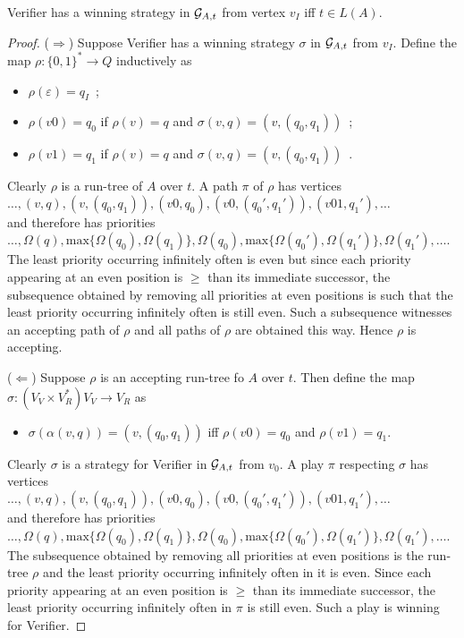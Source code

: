 \documentclass[runningheads,a4paper]{llncs}
\begin{document}
\begin{lemma}\label{lem:acceptance-game}
Verifier has a winning strategy in $\mathcal{G}_{A,t}$ from vertex $v_I$ iff $t \in L(A)$.
\end{lemma}

\begin{proof}
\noindent ($\Rightarrow$) Suppose Verifier has a winning strategy $\sigma$ in $\mathcal{G}_{A,t}$ from $v_I$. Define the map $\rho: \{0,1\}^* \to Q$ inductively as 
\begin{itemize}
\item $\rho(\varepsilon) = q_I$\ ;
\item $\rho(v0) = q_0$ if $\rho(v) = q$ and $\sigma(v,q) = (v,(q_0,q_1))$\ ;
\item $\rho(v1) = q_1$ if $\rho(v) = q$ and $\sigma(v,q) = (v,(q_0,q_1))$\ .
\end{itemize}
Clearly $\rho$ is a run-tree of $A$ over $t$. A path $\pi$ of $\rho$ has vertices \\
 $\ldots,(v,q), (v,(q_0,q_1)), (v0, q_0), (v0,(q_0',q_1')), (v01, q_1'),\ldots$ \\ and therefore has priorities\\
 $\ldots,\Omega(q), \mathrm{max}\{\Omega(q_0), \Omega(q_1)\}, \Omega(q_0), \mathrm{max}\{\Omega(q_0'), \Omega(q_1')\}, \Omega(q_1'),\ldots$.\\
The least priority occurring infinitely often is even but since each priority appearing at an even position is $\geq$ than its immediate successor, the subsequence obtained by removing all priorities at even positions is such that the least priority occurring infinitely often is still even. Such a subsequence witnesses an accepting path of $\rho$ and all paths of $\rho$ are obtained this way. Hence $\rho$ is accepting.

\noindent ($\Leftarrow$) Suppose $\rho$ is an accepting run-tree fo $A$ over $t$. Then define the map 
 $\sigma: (V_V \times V_R^*)V_V \to V_R$ as 
\begin{itemize}
\item $\sigma(\alpha (v,q)) = (v,(q_0,q_1))$ iff $\rho(v0) = q_0$ and $\rho(v1) = q_1$.
\end{itemize}
Clearly $\sigma$ is a strategy for Verifier in $\mathcal{G}_{A,t}$ from $v_0$. A play $\pi$ respecting $\sigma$ has vertices \\
 $\ldots,(v,q), (v,(q_0,q_1)), (v0, q_0), (v0,(q_0',q_1')), (v01, q_1'),\ldots$ \\ and therefore has priorities\\
 $\ldots,\Omega(q), \mathrm{max}\{\Omega(q_0), \Omega(q_1)\}, \Omega(q_0), \mathrm{max}\{\Omega(q_0'), \Omega(q_1')\}, \Omega(q_1'),\ldots$.\\
The subsequence obtained by removing all priorities at even positions is the run-tree $\rho$ and the least priority occurring infinitely often in it is even. Since each priority appearing at an even position is $\geq$ than its immediate successor, the least priority occurring infinitely often in $\pi$ is still even. Such a play is winning for Verifier.
\end{proof}
\end{document}
